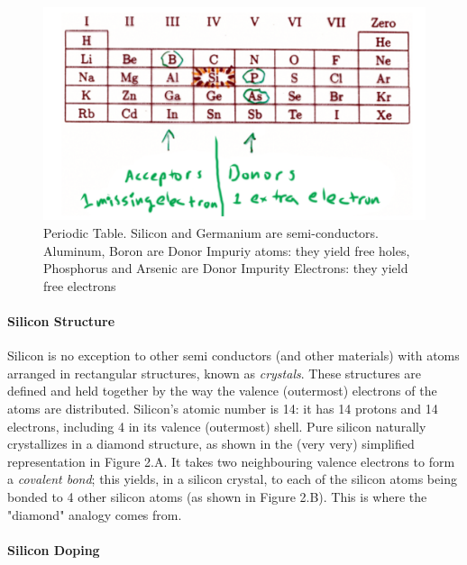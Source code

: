 \begin{figure}[H]
    \centering
    \includegraphics[width=0.95\linewidth]{../../Figures/Periodic_Table_Silicon.PNG}
    \caption{Periodic Table. Silicon and Germanium are semi-conductors. Aluminum, Boron are Donor Impuriy atoms: they yield free holes, Phosphorus and Arsenic are Donor Impurity Electrons: they yield free electrons}
    \label{fig:basalandcerebellum}
\end{figure}

\paragraph{Silicon Structure}

Silicon is no exception to other semi conductors (and other materials) with atoms arranged in rectangular structures, known as \textit{crystals}. These structures are defined and held together by the way the valence (outermost) electrons of the atoms are distributed. Silicon's atomic number is 14: it has 14 protons and 14 electrons, including 4 in its valence (outermost) shell. Pure silicon naturally crystallizes in a diamond structure, as shown in the (very very) simplified representation in Figure 2.A. It takes two neighbouring valence electrons to form a \textit{covalent bond}; this yields, in a silicon crystal, to each of the silicon atoms being bonded to 4 other silicon atoms (as shown in Figure 2.B). This is where the "diamond" analogy comes from. 
 
\paragraph{Silicon Doping}

